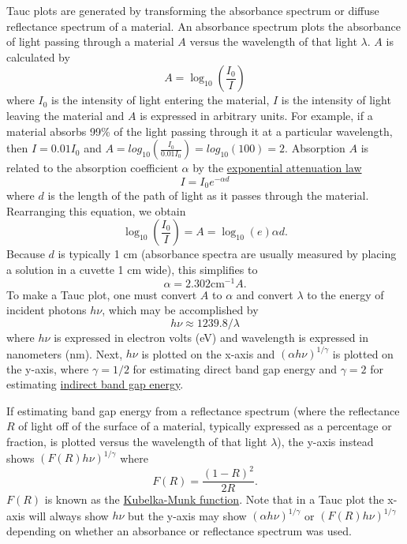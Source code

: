 \documentclass[letterpaper, 12pt]{article}
\begin{document}
Tauc plots are generated by transforming the absorbance spectrum or diffuse reflectance spectrum of a material. An absorbance spectrum plots the absorbance of light passing through a material $A$ versus the wavelength of that light $\lambda$. $A$ is calculated by
\begin{equation*}
    A = \log_{10}(\frac{I_0}{I})
\end{equation*}
where $I_0$ is the intensity of light entering the material, $I$ is the intensity of light leaving the material and $A$ is expressed in arbitrary units. For example, if a material absorbs 99\% of the light passing through it at a particular wavelength, then $I = 0.01I_0$ and $A = log_{10}(\frac{I_0}{0.01I_0}) = log_{10}(100) = 2$. Absorption $A$ is related to the absorption coefficient $\alpha$ by the \href{https://en.wikipedia.org/wiki/Beer%E2%80%93Lambert_law#History}{exponential attenuation law}
\begin{equation*}
    I = I_0e^{-\alpha d}
\end{equation*}
where $d$ is the length of the path of light as it passes through the material. Rearranging this equation, we obtain
\begin{equation*}
    \log_{10}(\frac{I_0}{I}) = A = \log_{10}(e)\alpha d.
\end{equation*}
Because $d$ is typically 1 cm (absorbance spectra are usually measured by placing a solution in a cuvette 1 cm wide), this simplifies to
\begin{equation*}
    \alpha = 2.302\textrm{cm}^{-1}A.
\end{equation*}
To make a Tauc plot, one must convert $A$ to $\alpha$ and convert $\lambda$ to the energy of incident photons $h\nu$, which may be accomplished by
\begin{equation*}
    h \nu \approx 1239.8/\lambda
\end{equation*}
where $h\nu$ is expressed in electron volts (eV) and wavelength is expressed in nanometers (nm). Next, $h\nu$ is plotted on the x-axis and $(\alpha h \nu)^{1/\gamma}$ is plotted on the y-axis, where $\gamma = 1/2$ for estimating direct band gap energy and $\gamma = 2$ for estimating \href{https://www.doitpoms.ac.uk/tlplib/semiconductors/direct.php}{indirect band gap energy}.

If estimating band gap energy from a reflectance spectrum (where the reflectance $R$ of light off of the surface of a material, typically expressed as a percentage or fraction, is plotted versus the wavelength of that light $\lambda$), the y-axis instead shows $(F(R) h \nu)^{1/\gamma}$ where
\begin{equation*}
    F(R) = \frac{(1-R)^2}{2R}.
\end{equation*}
$F(R)$ is known as the \href{https://en.wikipedia.org/wiki/Kubelka%E2%80%93Munk_theory}{Kubelka-Munk function}. Note that in a Tauc plot the x-axis will always show $h\nu$ but the y-axis may show $(\alpha h \nu)^{1/\gamma}$ or $(F(R) h \nu)^{1/\gamma}$ depending on whether an absorbance or reflectance spectrum was used.
\end{document}
